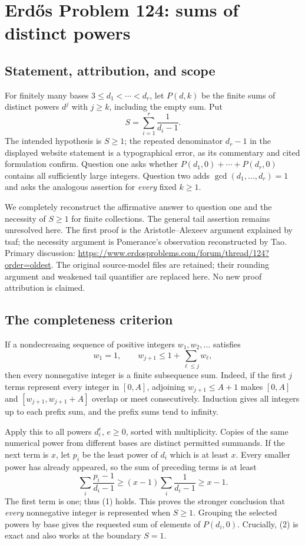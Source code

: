 \section*{Erd\H{o}s Problem 124: sums of distinct powers}
\subsection*{Statement, attribution, and scope}
For finitely many bases $3\le d_1<\cdots<d_r$, let $P(d,k)$ be the finite sums of distinct powers $d^j$ with $j\ge k$, including the empty sum. Put
\[
 S=\sum_{i=1}^r\frac1{d_i-1}.
\]
The intended hypothesis is $S\ge1$; the repeated denominator $d_r-1$ in the displayed website statement is a typographical error, as its commentary and cited formulation confirm. Question one asks whether $P(d_1,0)+\cdots+P(d_r,0)$ contains all sufficiently large integers. Question two adds $\gcd(d_1,\ldots,d_r)=1$ and asks the analogous assertion for \emph{every} fixed $k\ge1$.

We completely reconstruct the affirmative answer to question one and the necessity of $S\ge1$ for finite collections. The general tail assertion remains unresolved here. The first proof is the Aristotle--Alexeev argument explained by tsaf; the necessity argument is Pomerance's observation reconstructed by Tao. Primary discussion: \url{https://www.erdosproblems.com/forum/thread/124?order=oldest}. The original source-model files are retained; their rounding argument and weakened tail quantifier are replaced here. No new proof attribution is claimed.

\subsection*{The completeness criterion}
If a nondecreasing sequence of positive integers $w_1,w_2,\ldots$ satisfies
\[
 w_1=1,\qquad w_{j+1}\le1+\sum_{\ell\le j}w_\ell, \tag{1}
\]
then every nonnegative integer is a finite subsequence sum. Indeed, if the first $j$ terms represent every integer in $[0,A]$, adjoining $w_{j+1}\le A+1$ makes $[0,A]$ and $[w_{j+1},w_{j+1}+A]$ overlap or meet consecutively. Induction gives all integers up to each prefix sum, and the prefix sums tend to infinity.

Apply this to all powers $d_i^e$, $e\ge0$, sorted with multiplicity. Copies of the same numerical power from different bases are distinct permitted summands. If the next term is $x$, let $p_i$ be the least power of $d_i$ which is at least $x$. Every smaller power has already appeared, so the sum of preceding terms is at least
\[
 \sum_i\frac{p_i-1}{d_i-1}
 \ge (x-1)\sum_i\frac1{d_i-1}
 \ge x-1. \tag{2}
\]
The first term is one; thus (1) holds. This proves the stronger conclusion that \emph{every} nonnegative integer is represented when $S\ge1$. Grouping the selected powers by base gives the requested sum of elements of $P(d_i,0)$. Crucially, (2) is exact and also works at the boundary $S=1$.

